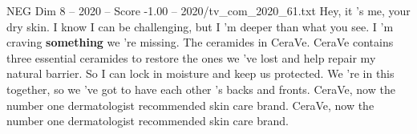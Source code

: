 \begin{textsample}{NEG Dim 8 – 2020 – Score -1.00 – 2020/tv\_com\_2020\_61.txt}  \label{ex:f8_neg_077}
Hey, it 's me, your dry skin.
I know I can be challenging, but I 'm deeper than what you see.
I 'm craving \textbf{something} we 're missing.
The ceramides in CeraVe.
CeraVe contains three essential ceramides to restore the ones we 've lost and help repair my natural barrier.
So I can lock in moisture and keep us protected.
We 're in this together, so we 've got to have each other 's backs and fronts.
CeraVe, now the number one dermatologist recommended skin care brand.
CeraVe, now the number one dermatologist recommended skin care brand.

\end{textsample}
